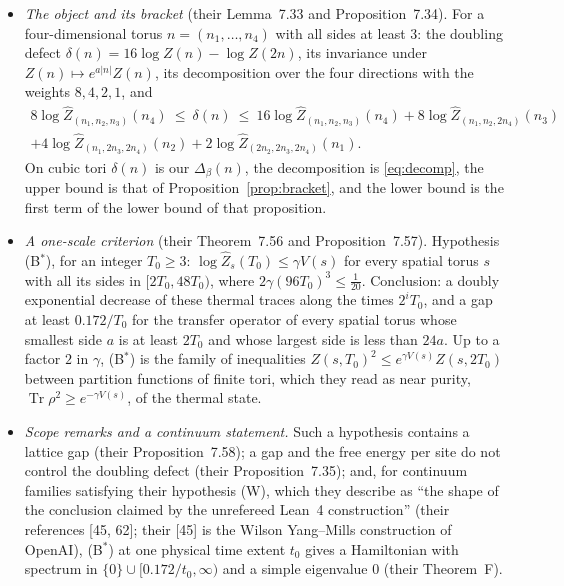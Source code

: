 \documentclass[11pt,a4paper]{article}
\theoremstyle{plain}
\theoremstyle{definition}
\theoremstyle{remark}
\numberwithin{equation}{section}
\newcommand{\Tr}{\operatorname{Tr}}
\begin{document}
\begin{itemize}
\item[(a)] \emph{The object and its bracket} (their Lemma~7.33 and Proposition~7.34). For a four-dimensional torus $n=(n_1,\dots,n_4)$ with
all sides at least $3$: the doubling defect $\delta(n)=16\log Z(n)-\log Z(2n)$, its invariance under $Z(n)\mapsto e^{a|n|}Z(n)$, its
decomposition over the four directions with the weights $8,4,2,1$, and
\begin{multline*}
8\log\widehat Z_{(n_1,n_2,n_3)}(n_4)\ \le\ \delta(n)\ \le\ 16\log\widehat Z_{(n_1,n_2,n_3)}(n_4)+8\log\widehat Z_{(n_1,n_2,2n_4)}(n_3)\\
+4\log\widehat Z_{(n_1,2n_3,2n_4)}(n_2)+2\log\widehat Z_{(2n_2,2n_3,2n_4)}(n_1).
\end{multline*}
On cubic tori $\delta(n)$ is our $\Delta_\beta(n)$, the decomposition is \eqref{eq:decomp}, the upper bound is that of
Proposition~\ref{prop:bracket}, and the lower bound is the first term of the lower bound of that proposition.
\item[(b)] \emph{A one-scale criterion} (their Theorem~7.56 and Proposition~7.57). Hypothesis (B$^*$), for an integer $T_0\ge3$:
$\log\widehat Z_s(T_0)\le\gamma V(s)$ for every spatial torus $s$ with all its sides in $[2T_0,48T_0)$, where $2\gamma(96T_0)^3\le\frac1{20}$.
Conclusion: a doubly exponential decrease of these thermal traces along the times $2^iT_0$, and a gap at least $0.172/T_0$ for the transfer
operator of every spatial torus whose smallest side $a$ is at least $2T_0$ and whose largest side is less than $24a$. Up to a factor $2$ in
$\gamma$, (B$^*$) is the family of inequalities $Z(s,T_0)^2\le e^{\gamma V(s)}Z(s,2T_0)$ between partition functions of finite tori, which
they read as near purity, $\Tr\rho^2\ge e^{-\gamma V(s)}$, of the thermal state.
\item[(c)] \emph{Scope remarks and a continuum statement.} Such a hypothesis contains a lattice gap (their Proposition~7.58); a gap and
the free energy per site do not control the doubling defect (their Proposition~7.35); and, for continuum families satisfying their
hypothesis (W), which they describe as ``the shape of the conclusion claimed by the unrefereed Lean~4 construction'' (their references
[45, 62]; their [45] is the Wilson Yang--Mills construction of OpenAI), (B$^*$) at one physical time extent $t_0$ gives a Hamiltonian with spectrum in $\{0\}\cup[0.172/t_0,\infty)$ and a simple eigenvalue $0$ (their Theorem~F).
\end{itemize}
\end{document}
